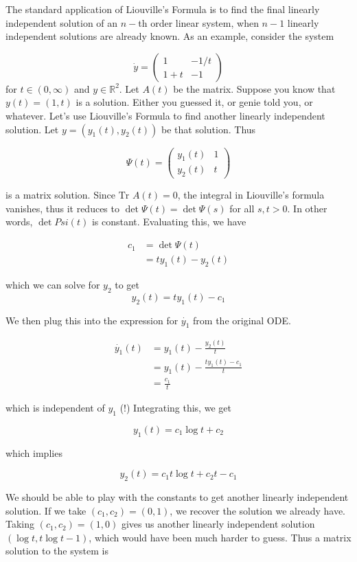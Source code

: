 \documentclass{article}
\def\R{{\mathbb R}}
\begin{document}
The standard application of Liouville's Formula is to find the final linearly independent solution of an $n-$th order linear system, when $n-1$ linearly independent solutions are already known. As an example, consider the system

\[
\dot{y} = 
\begin{pmatrix}1 & -1/t \\ 1 + t & -1 \end{pmatrix}
\] 
for $t \in (0, \infty)$ and $y \in \R^2$. Let $A(t)$ be the matrix. Suppose you know that $y(t) = (1, t)$ is a solution. Either you guessed it, or genie told you, or whatever. Let's use Liouville's Formula to find another linearly independent solution. Let $y = (y_1(t), y_2(t))$ be that solution. Thus 

\[
\Psi(t) = \begin{pmatrix}
y_1(t) & 1 \\
y_2(t) & t 
\end{pmatrix}
\]

is a matrix solution. Since $\text{Tr }A(t) = 0$, the integral in Liouville's formula vanishes, thus it reduces to $\det \Psi(t) = \det \Psi(s)$ for all $s,t > 0$. In other words, $\det Psi(t)$ is constant. Evaluating this, we have

\begin{align*}
c_1 &= \det \Psi(t) \\
&= t y_1(t) - y_2(t)
\end{align*}

which we can solve for $y_2$ to get
\[
y_2(t) = t y_1(t) - c_1
\]

We then plug this into the expression for $\dot{y_1}$ from the original ODE.

\begin{align*}
\dot{y_1}(t) &= y_1(t) - \frac{y_2(t)}{t} \\
&= y_1(t) - \frac{t y_1(t) - c_1}{t} \\
&= \frac{c_1}{t}
\end{align*}

which is independent of $y_1$ (!) Integrating this, we get

\[
y_1(t) = c_1 \log t + c_2
\]

which implies

\[
y_2(t) = c_1 t \log t + c_2 t - c_1
\]

We should be able to play with the constants to get another linearly independent solution. If we take $(c_1, c_2) = (0, 1)$, we recover the solution we already have. Taking $(c_1, c_2) = (1, 0)$ gives us another linearly independent solution $(\log t, t \log t - 1)$, which would have been much harder to guess. Thus a matrix solution to the system is
\end{document}
